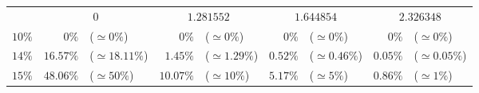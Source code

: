 \documentclass[10pt]{report}
\begin{document}
\begin{exercice}
\begin{center}
\begin{tabular}{|c|rl|rl|rl|rl|}
         & 
    \multicolumn{2}{c|}{$0$}
     & 
    \multicolumn{2}{c|}{$1.281552$}
     & 
    \multicolumn{2}{c|}{$1.644854$}
     & 
    \multicolumn{2}{c|}{$2.326348$}
    
    \\ \cline{1-9}

    
        $10\%$
         & 
    
        $0\%$
         & 
    
        ($\simeq0\%$)
         & 
    
        $0\%$
         & 
    
        ($\simeq0\%$)
         & 
    
        $0\%$
         & 
    
        ($\simeq0\%$)
         & 
    
        $0\%$
         & 
    
        ($\simeq0\%$)
        
    \\ 

    
        $14\%$
         & 
    
        $16.57\%$
         & 
    
        ($\simeq18.11\%$)
         & 
    
        $1.45\%$
         & 
    
        ($\simeq1.29\%$)
         & 
    
        $0.52\%$
         & 
    
        ($\simeq0.46\%$)
         & 
    
        $0.05\%$
         & 
    
        ($\simeq0.05\%$)
        
    \\ 

    
        $15\%$
         & 
    
        $48.06\%$
         & 
    
        ($\simeq50\%$)
         & 
    
        $10.07\%$
         & 
    
        ($\simeq10\%$)
         & 
    
        $5.17\%$
         & 
    
        ($\simeq5\%$)
         & 
    
        $0.86\%$
         & 
    
        ($\simeq1\%$)
        
    \\ 


\end{tabular}
\end{center}
\end{exercice}
\end{document}
